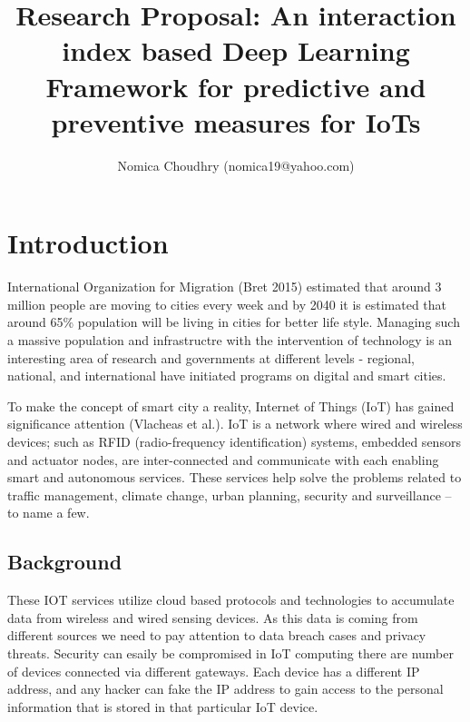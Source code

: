 \documentclass[10pt]{llncs}
\begin{document}
%
\title{Research Proposal: An interaction index based Deep Learning Framework for predictive and preventive measures for IoTs}
%
\author{
Nomica Choudhry (\selectfont\ttfamily\upshape nomica19@yahoo.com)\\
}


\maketitle

%
\section{Introduction}
International Organization for Migration (Bret 2015) estimated that around 3 million people are moving to cities every week and by 2040 it is estimated that around 65\% population will be living in cities for better life style. Managing such a massive population and infrastructre with the intervention of technology is an interesting area of research and governments at different levels - regional, national, and international have initiated programs on digital and smart cities.

To make the concept of smart city a reality, Internet of Things (IoT) has gained significance attention (Vlacheas et al.). IoT is a network where wired and wireless devices; such as RFID (radio-frequency identification) systems, embedded sensors and actuator nodes, are inter-connected and communicate with each enabling smart and autonomous services. These services help solve the problems related to traffic management, climate change, urban planning, security and surveillance – to name a few. 

%
\subsection{Background}
These IOT services utilize cloud based protocols and technologies to accumulate data from wireless and wired sensing devices. As this data is coming from different sources we need to pay attention to data breach cases and privacy threats. Security can esaily be compromised in IoT computing there are number of devices connected via different gateways. Each device has a different IP address, and any hacker can fake the IP address to gain access to the personal information that is stored in that particular IoT device.
\end{document}
